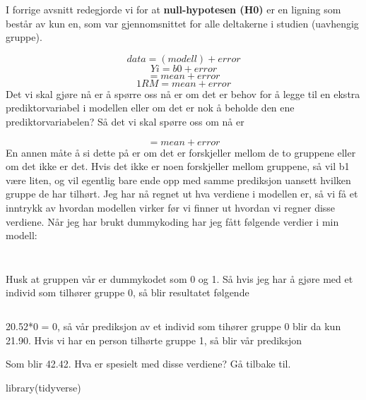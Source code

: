 \documentclass[
]{book}
\newenvironment{Shaded}{\begin{snugshade}}{\end{snugshade}}
\newcommand{\FunctionTok}[1]{\textcolor[rgb]{0.00,0.00,0.00}{#1}}
\newcommand{\NormalTok}[1]{#1}
\begin{document}
I forrige avsnitt redegjorde vi for at \textbf{null-hypotesen (H0)} er en ligning som består av kun en, som var gjennomsnittet for alle deltakerne i studien (uavhengig gruppe).

\[
data = (modell) + error
\]
\[
Yi = b0 + error
\]
\[
 = mean + error
\]
\[
1RM = mean + error
\]
Det vi skal gjøre nå er å spørre oss nå er om det er behov for å legge til en ekstra prediktorvariabel i modellen eller om det er nok å beholde den ene prediktorvariabelen? Så det vi skal spørre oss om nå er

\[
 = mean + error
\]
En annen måte å si dette på er om det er forskjeller mellom de to gruppene eller om det ikke er det. Hvis det ikke er noen forskjeller mellom gruppene, så vil b1 være liten, og vil egentlig bare ende opp med samme prediksjon uansett hvilken gruppe de har tilhørt. Jeg har nå regnet ut hva verdiene i modellen er, så vi få et inntrykk av hvordan modellen virker før vi finner ut hvordan vi regner disse verdiene. Når jeg har brukt dummykoding har jeg fått følgende verdier i min modell:

\[
\]

\[
\]

Husk at gruppen vår er dummykodet som 0 og 1. Så hvis jeg har å gjøre med et individ som tilhører gruppe 0, så blir resultatet følgende

\[
\]

\[
\]
20.52*0 = 0, så vår prediksjon av et individ som tihører gruppe 0 blir da kun 21.90. Hvis vi har en person tilhørte gruppe 1, så blir vår prediksjon

\[
\]
Som blir 42.42. Hva er spesielt med disse verdiene? Gå tilbake til.

\begin{Shaded}
\begin{Highlighting}[]
\FunctionTok{library}\NormalTok{(tidyverse)}
\end{Highlighting}
\end{Shaded}
\end{document}
